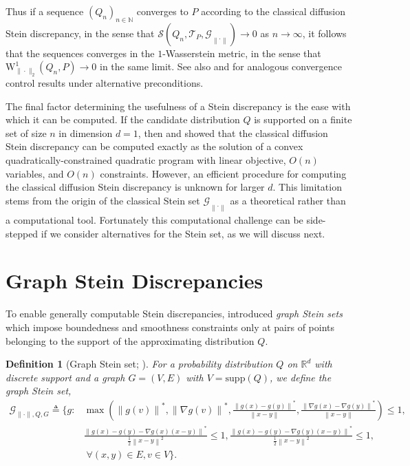 \documentclass[12pt,paper=letter]{scrreprt}
\newtheorem{definition}{Definition}[chapter]
\def\defeq{\triangleq} %
\newcommand{\textfrac}[2]{{\textstyle\frac{#1}{#2}}}
\def\norm#1{\left\|{#1}\right\|} %
\newcommand{\grad}{\nabla} %
\def\supp#1{\mathrm{supp}({#1})}
\newcommand{\gset}[0]{\mathcal{G}} %
\newcommand{\steinset}[0]{\steinsetarg{}} %
\newcommand{\steinsetarg}[1]{\gset_{\norm{\cdot}_{#1}}} %
\begin{document}
\noindent Thus if a sequence $(Q_n)_{n \in \mathbb{N}}$ converges to $P$ according to the classical diffusion Stein discrepancy, in the sense that $\mathcal{S}(Q_n,\mathcal{T}_P,\steinset) \rightarrow 0$ as $n \rightarrow \infty$, it follows that the sequences converges in the $1$-Wasserstein metric, in the sense that $\mathrm{W}_{\|\cdot\|_2}^1 (Q_n,P) \rightarrow 0$ in the same limit. See also \citet[Thm.~2.1 and Lem.~2.2]{MackeyGo16} and \citet[Thm.~2]{gorham2015measuring} for analogous convergence control results under alternative preconditions.

The final factor determining the usefulness of a Stein discrepancy is the ease with which it can be computed.
If the candidate distribution $Q$ is supported on a finite set of size $n$ in dimension $d = 1$, then \citet[Thm.~9]{gorham2015measuring} and \citet{Gorham2019} showed that the classical diffusion Stein discrepancy can be computed exactly as the solution of a convex quadratically-constrained quadratic program with linear objective, $O(n)$ variables, and $O(n)$ constraints.  
However, an efficient procedure for computing the classical diffusion Stein discrepancy is unknown for larger $d$.
This limitation stems from the origin of the classical Stein set $\steinset$ as a theoretical rather than a computational tool.
Fortunately this computational challenge can be side-stepped if we consider alternatives for the Stein set, as we will discuss next.



\section{Graph Stein Discrepancies}
\label{sec: graph sd}
To enable generally computable Stein discrepancies, \citet{gorham2015measuring} introduced \emph{graph Stein sets} which impose boundedness and smoothness constraints only at pairs of points belonging to the support of the approximating distribution $Q$.

\begin{definition}[Graph Stein set; \citealp{gorham2015measuring}]\label{def:graph_set}
For a probability distribution $Q$ on $\mathbb{R}^d$ with discrete support and a graph $G = (V,E)$ with $V = \supp{Q}$, we define the \emph{graph Stein set},
\begin{align*}
\mathcal{G}_{\|\cdot\|,Q,G} \defeq \bigg\{ g : & 
	\max\left(\norm{g(v)}^*, \norm{\grad g(v)}^*,
   	\textfrac{\norm{g(x) - g(y)}^*}{\norm{x - y}},
    \textfrac{\norm{\grad g(x) - \grad g(y)}^*}{\norm{x - y}} \right) \le 1,  \\
    & \textstyle\frac{\norm{g(x) - g(y) - {\grad g(x)}{(x - y)}}^*}{\frac{1}{2}\norm{x - y}^2} \leq 1,
    \textstyle\frac{\norm{g(x) - g(y) -{\grad g(y)}{(x -
    y)}}^*}{\frac{1}{2}\norm{x - y}^2} \leq 1, \\
    & \; \forall (x,y)\in E, v \in V \bigg\}.
\end{align*}
\end{definition}
\end{document}
